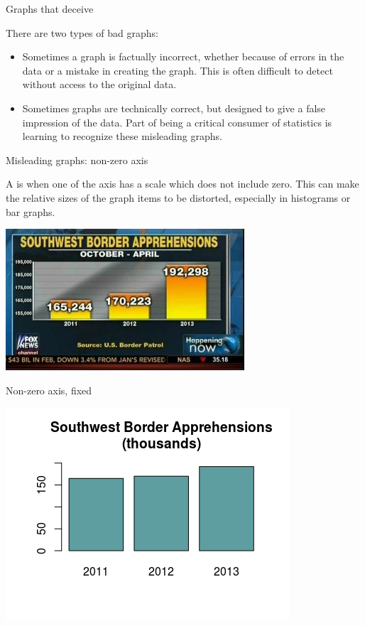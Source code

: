 \documentclass[xcolor=table, aspectratio=169, bigger]{beamer}
\begin{document}
\begin{frame}{Graphs that deceive}
\begin{block}{}
There are two types of bad graphs:
\begin{itemize}
\item Sometimes a graph is factually incorrect, whether because of errors in the data or a mistake in creating the graph. This is often difficult to detect without access to the original data.
\item Sometimes graphs are technically correct, but designed to give a false impression of the data. Part of being a critical consumer of statistics is learning to recognize these misleading graphs.
\end{itemize}
\end{block}
\end{frame}

\begin{frame}{Misleading graphs: non-zero axis}
\begin{block}{}
A  is when one of the axis has a scale which does not include zero. This can make the relative sizes of the graph items to be distorted, especially in histograms or bar graphs.
\end{block}
\pause
\begin{center}
\includegraphics[width=3.5in]{../images/wk04_bad_nonzero}\par
\end{center}
\end{frame}

\begin{frame}{Non-zero axis, fixed}
\begin{center}
\includegraphics{../images/wk04_bad_nonzero_fixed} 
\end{center}
\end{frame}
\end{document}
